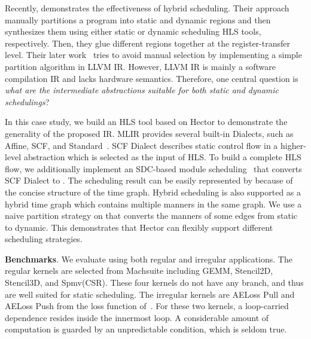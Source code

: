


Recently, \cite{cheng_dss} demonstrates the effectiveness of hybrid scheduling. Their approach manually partitions a program into static and dynamic regions and then synthesizes them using either static or dynamic scheduling HLS tools, respectively. Then, they glue different regions together at the register-transfer level. Their later work~\cite{find_islands} tries to avoid manual selection by implementing a simple partition algorithm in LLVM IR. However, LLVM IR is mainly a software compilation IR and lacks hardware semantics. Therefore, one central question is \textit{what are the intermediate abstractions suitable for both static and dynamic schedulings}?

In this case study, we build an HLS tool based on Hector to demonstrate the generality of the proposed IR. MLIR provides several built-in Dialects, such as Affine, SCF, and Standard~\cite{mlir}. SCF Dialect describes static control flow in a higher-level abstraction which is selected as the input of HLS. To build a complete HLS flow, we additionally implement an SDC-based module scheduling~\cite{sdc-modulo-13} that converts SCF Dialect to \tor. The scheduling result can be easily represented by \tor because of the concise structure of the time graph. Hybrid scheduling is also supported as a hybrid time graph which contains multiple manners in the same graph. We use a naive partition strategy on \tor that converts the manners of some edges from static to dynamic. This demonstrates that Hector can flexibly support different scheduling strategies.

\textbf{Benchmarks}. We evaluate using both regular and irregular applications. The regular kernels are selected from Machsuite\cite{machsuite} including GEMM, Stencil2D, Stencil3D, and Spmv(CSR). These four kernels do not have any branch, and thus are well suited for static scheduling. The irregular kernels are AELoss Pull and AELoss Push from the loss function of~\cite{aeloss}. For these two kernels, a loop-carried dependence resides inside the innermost loop. A considerable amount of computation is guarded by an unpredictable condition, which is seldom true.

